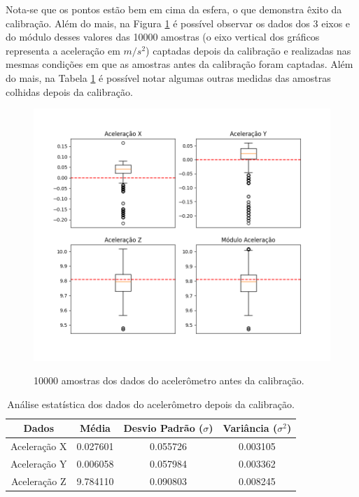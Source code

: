 \documentclass[acronym, symbols, table]{fei}
\begin{document}
					Nota-se que os pontos estão bem em cima da esfera, o que demonstra êxito da calibração. Além do mais, na Figura \ref{fig:dados_acelerometro_certos} é possível observar os dados dos 3 eixos e do módulo desses valores das 10000 amostras (o eixo vertical dos gráficos representa a aceleração em $m/s^2$) captadas depois da calibração e realizadas nas mesmas condições em que as amostras antes da calibração foram captadas. Além do mais, na Tabela \ref{tab:acelerometro_depois_calibracao} é possível notar algumas outras medidas das amostras colhidas depois da calibração.
					
					\begin{figure}[!htb]
						\centering
						\caption{10000 amostras dos dados do acelerômetro antes da calibração.}
						\includegraphics[width=1.0\textwidth]{dados_acelerometro_certos.png}
						\label{fig:dados_acelerometro_certos}
					\end{figure}
					
					\begin{table}[!htb]
						\centering
						\caption{Análise estatística dos dados do acelerômetro depois da calibração.}\label{tab:acelerometro_depois_calibracao}
						\begin{tabular}{|c|c|c|c|}
							\hline
							Dados & Média & Desvio Padrão ($\sigma$) & Variância ($\sigma^2$) \\ \hline
							\small Aceleração X & 0.027601  & 0.055726 & 0.003105 \\ \hline
							\small Aceleração Y & 0.006058  & 0.057984 & 0.003362 \\ \hline
							\small Aceleração Z & 9.784110  & 0.090803 & 0.008245 \\ \hline			
						\end{tabular}
					\end{table}
					
\end{document}
